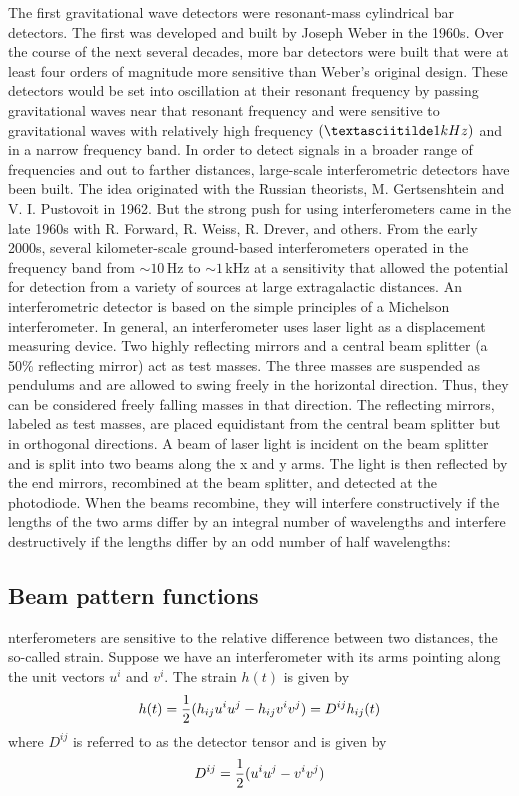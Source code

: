 \documentclass[binding=0.6cm, LaM]{sapthesis}
\begin{document}
The first gravitational wave detectors were resonant-mass cylindrical bar detectors. The first was developed and built by Joseph Weber in the 1960s. Over the course of the next several decades, more bar detectors were built that were at least four orders of magnitude more sensitive than Weber’s original design. These detectors would be set into oscillation at their resonant frequency by passing gravitational waves near that resonant frequency and were sensitive to gravitational waves with relatively high frequency $(\textasciitilde 1 kHz)$ and in a narrow frequency band. In order to detect signals in a broader range of frequencies and out to farther distances, large-scale interferometric detectors have been built. The idea originated with the Russian theorists, M. Gertsenshtein and V. I. Pustovoit in 1962. But the strong push for using interferometers came in the late 1960s with R. Forward, R. Weiss, R. Drever, and others. From the early 2000s, several kilometer-scale ground-based interferometers operated in the frequency band from $\sim 10$\,Hz to $\sim 1$\,kHz at a sensitivity that allowed the potential for detection from a variety of sources at large extragalactic distances.
An interferometric detector is based on the simple principles of a Michelson interferometer. In general, an interferometer uses laser light as a displacement measuring device. Two highly reflecting mirrors and a central beam splitter (a 50\% reflecting mirror) act as test masses. The three masses are suspended as pendulums and are allowed to swing freely in the horizontal direction. Thus, they can be considered freely falling masses in that direction. The reflecting mirrors,  labeled as test masses, are placed equidistant from the central beam splitter but in orthogonal directions.
A beam of laser light is incident on the beam splitter and is split into two beams along the x and y arms. The light is then reflected by the end mirrors, recombined at the beam splitter, and detected at the photodiode. When the beams recombine, they will interfere constructively if the lengths of the two arms differ by an integral number of wavelengths and interfere destructively if the lengths differ by an odd number of half wavelengths:

%
\subsection{Beam pattern functions}
nterferometers are sensitive to the relative difference between two distances, the so-called strain. Suppose we have an interferometer with its arms pointing along the unit vectors $u^i$ and $v^i$. The strain $h(t)$ is given by
\begin{equation}
h(t) = {1 \over 2} (h_{ij}u^iu^j - h_{ij}v^iv^j) = D^{ij}h_{ij}(t)
\end{equation}
where $D^{ij}$ is referred to as the detector tensor and is given by
\begin{equation}
D^{ij} = {1\over 2} (u^iu^j -v^iv^j)
\end{equation}
\end{document}
